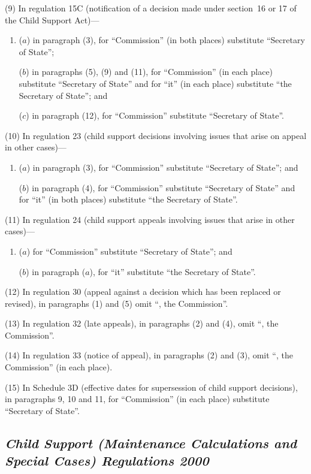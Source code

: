 \documentclass[12pt,a4paper]{article}
\begin{document}
(9) In regulation 15C (notification of a decision made under section~16 or 17 of the Child Support Act)—
\begin{enumerate}\item[]
($a$) in paragraph (3), for “Commission” (in both places) substitute “Secretary of State”;

($b$) in paragraphs (5), (9) and (11), for “Commission” (in each place) substitute “Secretary of State” and for “it” (in each place) substitute “the Secretary of State”; and

($c$) in paragraph (12), for “Commission” substitute “Secretary of State”.
\end{enumerate}

(10) In regulation 23 (child support decisions involving issues that arise on appeal in other cases)—
\begin{enumerate}\item[]
($a$) in paragraph (3), for “Commission” substitute “Secretary of State”; and

($b$) in paragraph (4), for “Commission” substitute “Secretary of State” and for “it” (in both places) substitute “the Secretary of State”.
\end{enumerate}

(11) In regulation 24 (child support appeals involving issues that arise in other cases)—
\begin{enumerate}\item[]
($a$) for “Commission” substitute “Secretary of State”; and

($b$) in paragraph ($a$), for “it” substitute “the Secretary of State”.
\end{enumerate}

(12) In regulation 30 (appeal against a decision which has been replaced or revised), in paragraphs (1) and (5) omit “, the Commission”.

(13) In regulation 32 (late appeals), in paragraphs (2) and (4), omit “, the Commission”.

(14) In regulation 33 (notice of appeal), in paragraphs (2) and (3), omit “, the Commission” (in each place).

(15) In Schedule 3D (effective dates for supersession of child support decisions), in paragraphs 9, 10 and 11, for “Commission” (in each place) substitute “Secretary of State”.

\subsection*{\itshape Child Support (Maintenance Calculations and Special Cases) Regulations 2000}
\end{document}
